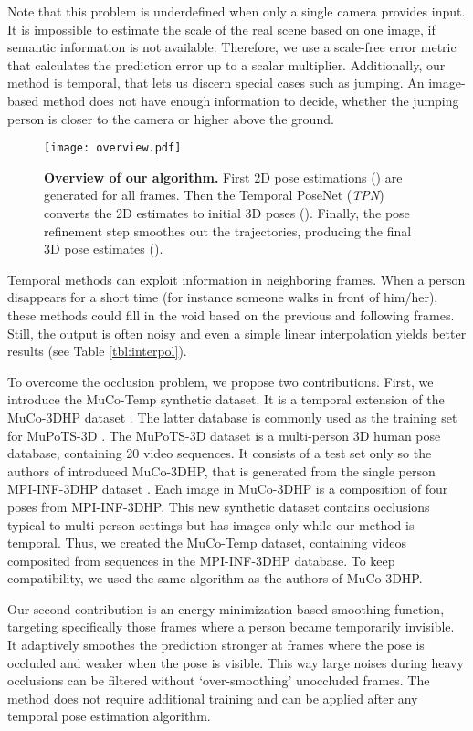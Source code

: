 \documentclass[runningheads, envcountsame, a4paper]{llncs}
\begin{document}
Note that this problem is underdefined when only a single camera provides input. It is impossible to estimate the scale of the real scene based on one image, if semantic information is not available. Therefore, we use a scale-free error metric that calculates the prediction error up to a scalar multiplier. Additionally, our method is temporal, that lets us discern special cases such as jumping. An image-based method does not have enough information to decide, whether the jumping person is closer to the camera or higher above the ground.

\begin{figure*}[t]
\centering
\texttt{[image: overview.pdf]}
\caption{\textbf{Overview of our algorithm.} First 2D pose estimations () are generated for all frames. Then the Temporal PoseNet (\textit{TPN}) converts the 2D estimates to initial 3D poses (). Finally, the pose refinement step smoothes out the trajectories, producing the final 3D pose estimates ().}
\label{fig:overview}
\end{figure*}

Temporal methods can exploit information in neighboring frames. When a person disappears for a short time (for instance someone walks in front of him/her), these methods could fill in the void based on the previous and following frames. Still, the output is often noisy and even a simple linear interpolation yields better results (see Table \ref{tbl:interpol}).

To overcome the occlusion problem, we propose two contributions. First, we introduce the MuCo-Temp synthetic dataset. It is a temporal extension of the MuCo-3DHP dataset \cite{mehta2018single_shot}. The latter database is commonly used as the training set for MuPoTS-3D \cite{mehta2018single_shot}. The MuPoTS-3D dataset is a multi-person 3D human pose database, containing 20 video sequences. It consists of a test set only so the authors of \cite{mehta2018single_shot} introduced MuCo-3DHP, that is generated from the single person MPI-INF-3DHP dataset \cite{mehta}. Each image in MuCo-3DHP is a composition of four poses from MPI-INF-3DHP. This new synthetic dataset contains occlusions typical to multi-person settings but has images only while our method is temporal. 
Thus, we created the MuCo-Temp dataset, containing videos composited from sequences in the MPI-INF-3DHP database. To keep compatibility, we used the same algorithm as the authors of MuCo-3DHP.

Our second contribution is an energy minimization based smoothing function, targeting specifically those frames where a person became temporarily invisible. It adaptively smoothes the prediction stronger at frames where the pose is occluded and weaker when the pose is visible. This way large noises during heavy occlusions can be filtered without  `over-smoothing' unoccluded frames. The method does not require additional training and can be applied after any temporal pose estimation algorithm.
\end{document}

